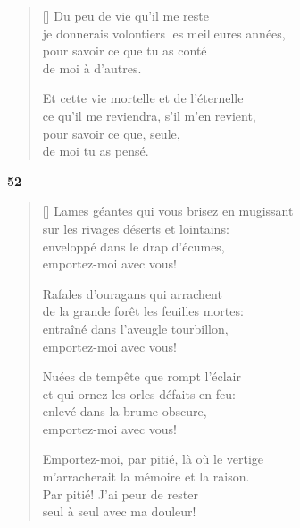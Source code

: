 \documentclass[a4paper,12pt]{book}
\begin{document}
\settowidth{\versewidth}{je donnerais volontiers les meilleures années,}

\begin{verse}[\versewidth]
  Du peu de vie qu'il me reste \\
  je donnerais volontiers les meilleures années, \\
  pour savoir ce que tu as conté \\
  de moi à d'autres.

  Et cette vie mortelle et de l'éternelle \\
  ce qu'il me reviendra, s'il m'en revient, \\
  pour savoir ce que, seule, \\
  de moi tu as pensé.
\end{verse}

\bigskip

\begin{center}
  \textbf{52}
\end{center}

\settowidth{\versewidth}{Lames géantes qui vous brisez en mugissant}

\begin{verse}[\versewidth]
  Lames géantes qui vous brisez en mugissant \\
  sur les rivages déserts et lointains: \\
  enveloppé dans le drap d'écumes, \\
  emportez-moi avec vous!

  Rafales d'ouragans qui arrachent \\
  de la grande forêt les feuilles mortes: \\
  entraîné dans l'aveugle tourbillon, \\
  emportez-moi avec vous!

  Nuées de tempête que rompt l'éclair \\
  et qui ornez les orles défaits en feu: \\
  enlevé dans la brume obscure, \\
  emportez-moi avec vous!

  Emportez-moi, par pitié, là où le vertige \\
  m'arracherait la mémoire et la raison. \\
  Par pitié! J'ai peur de rester \\
  seul à seul avec ma douleur!
\end{verse}
\end{document}
